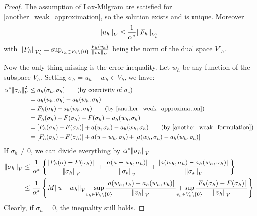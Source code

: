 \begin{proof}
    The assumption of Lax-Milgram are satisfied for \eqref{another_weak_approximation}, so the solution exists and is unique. Moreover
    \[
        \norm{u_h}_V \leq \frac{1}{\alpha^*} \norm{F_h}_{V'_h} 
    \]
    with \(\norm{F_h}_{V'_h} = \sup_{v_h \in V_h \backslash \left\{0\right\}} \frac{F_h(v_h)}{\norm{v_h}_V}\) being the norm of the dual space \(V'_h\).

    Now the only thing missing is the error inequality. Let \(w_h\) be any function of the subspace \(V_h\). Setting \(\sigma_h = u_h -w_h \in V_h\), we have:
    \begin{align*}
        \alpha^* \norm{\sigma_h}^2_V &\leq a_h(\sigma_h, \sigma_h) \tag*{(by coercivity of \(a_h\))} \\
        &= a_h(u_h, \sigma_h) - a_h(w_h, \sigma_h) \\
        &= F_h(\sigma_h) - a_h(w_h, \sigma_h) \tag*{(by \eqref{another_weak_approximation})} \\
        &= F_h(\sigma_h) - F(\sigma_h) + F(\sigma_h) - a_h(w_h, \sigma_h) \\
        &= \left[F_h(\sigma_h)-F(\sigma_h)\right] + a(u, \sigma_h) - a_h(w_h, \sigma_h) \tag*{(by \eqref{another_weak_formulation})} \\
        &= \left[F_h(\sigma_h) - F(\sigma_h)\right] + a(u-w_h, \sigma_h) + \left[a(w_h, \sigma_h) - a_h(w_h, \sigma_h)\right]
    \end{align*}
    If \(\sigma_h \neq 0\), we can divide everything by \(\alpha^*\norm{\sigma_h}_V\)
    \begin{align*}
        \norm{\sigma_h}_V &\leq \frac{1}{\alpha^*} \left\{\frac{\abs*{F_h(\sigma) - F(\sigma_h)}}{\norm{\sigma_h}_V} + \frac{\abs*{a(u-w_h,\sigma_h)}}{\norm{\sigma_h}_v} + \frac{\abs*{a(w_h, \sigma_h) - a_h(w_h, \sigma_h)}}{\norm{\sigma_h}_V}\right\} \\
        &\leq \frac{1}{\alpha^*} \left\{M\norm{u-w_h}_V + \sup_{\mathclap{v_h \in V_h \backslash \left\{0\right\}}} \frac{\abs*{a(w_h, v_h) - a_h(w_h, v_h)}}{\norm{v_h}_V} + \sup_{\mathclap{v_h \in V_h \backslash \left\{0\right\}}}\frac{\abs*{F_h(\sigma_h)-F(\sigma_h)}}{\norm{v_h}_V}\right\}
    \end{align*}
    Clearly, if \(\sigma_h = 0\), the inequality still holds.


\end{proof}
